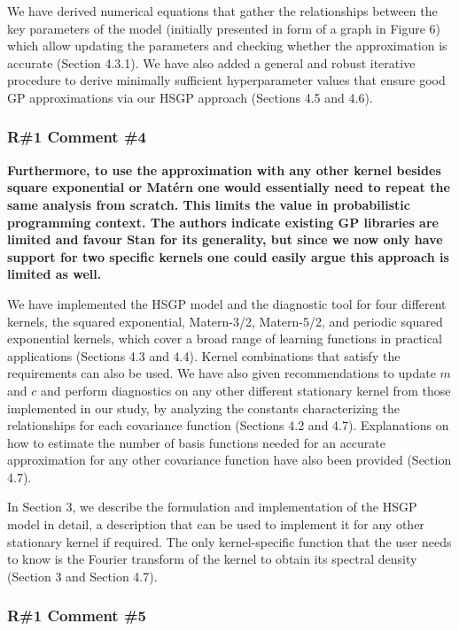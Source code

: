 \documentclass[11pt]{report}
\begin{document}
We have derived numerical equations that gather the relationships between the key parameters of the model (initially presented in form of a graph in Figure 6) which allow updating the parameters and checking whether the approximation is accurate (Section 4.3.1). We have also added a general and robust iterative procedure to derive minimally sufficient hyperparameter values that ensure good GP approximations via our HSGP approach (Sections 4.5 and 4.6).

\subsubsection*{R\#1 Comment \#4}

\textbf{Furthermore, to use the approximation with any other kernel besides square exponential or Matérn one would essentially need to repeat the same analysis from scratch. This limits the value in probabilistic programming context. The authors indicate existing GP  libraries are limited and favour Stan for its generality, but since we now only have support for two specific kernels one could easily argue this approach is limited as well.}

We have implemented the HSGP model and the diagnostic tool for four different kernels, the squared exponential, Matern-3/2, Matern-5/2, and periodic squared exponential kernels, which cover a broad range of learning functions in practical applications (Sections 4.3 and 4.4). Kernel combinations that satisfy the requirements can also be used. We have also given recommendations to update $m$ and $c$ and perform diagnostics on any other different stationary kernel from those implemented in our study, by analyzing the constants characterizing the relationships for each covariance function (Sections 4.2 and 4.7). Explanations on how to estimate the number of basis functions needed for an accurate approximation for any other covariance function have also been provided (Section 4.7).

In Section 3, we describe the formulation and implementation of the HSGP model in detail, a description that can be used to implement it for any other stationary kernel if required. The only kernel-specific function that the user needs to know is the Fourier transform of the kernel to obtain its spectral density (Section 3 and Section 4.7).

\subsubsection*{R\#1 Comment \#5}
\end{document}
